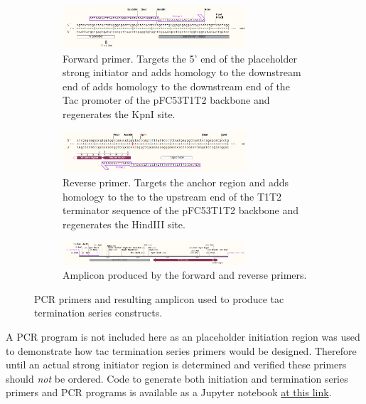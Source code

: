 \documentclass[11pt]{article}
\begin{document}
\begin{figure}[H]
	\centering
	\begin{subfigure}[b]{\textwidth}
		\centering
		\includegraphics[width=0.75\textwidth]{images/primers/t7-term-forward.png}
		\caption{Forward primer. Targets the 5' end of the placeholder strong initiator and adds homology to the downstream end of adds homology to the downstream end of the Tac promoter of the pFC53T1T2 backbone and regenerates the KpnI site.}
		\label{fig:y equals x}
	\end{subfigure}
	\vfill
	\begin{subfigure}[b]{\textwidth}
		\centering
		\includegraphics[width=0.75\textwidth]{images/primers/t7-term-reverse.png}
		\caption{Reverse primer. Targets the anchor region and adds homology to the to the upstream end of the T1T2 terminator sequence of the pFC53T1T2 backbone and regenerates the HindIII site.}
		\label{fig:three sin x}
	\end{subfigure}
	\vfill
	\begin{subfigure}[b]{\textwidth}
		\centering
		\includegraphics[width=0.75\textwidth]{images/primers/t7-term-amplicon.png}
		\caption{Amplicon produced by the forward and reverse primers.}
		\label{fig:three sin x}
	\end{subfigure}
	\caption{PCR primers and resulting amplicon used to produce tac termination series constructs.}
\end{figure}


A PCR program is not included here as an placeholder initiation region was used to demonstrate how tac termination series primers would be designed. Therefore until an actual strong initiator region is determined and verified these primers should \emph{not} be ordered. Code to generate both initiation and termination series primers and PCR programs is available as a Jupyter notebook \href{https://github.com/EthanHolleman/plasmid-VR-design/blob/main/notes/tac_series_primers.ipynb}{at this link}. 
\end{document}
